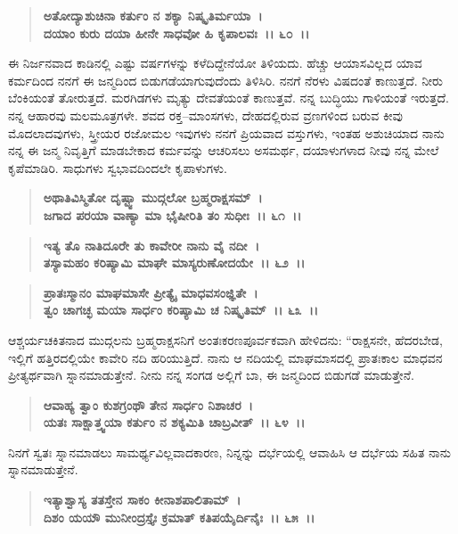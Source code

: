 \begin{verse}
\textbf{ಅತೋದ್ಯಾಶುಚಿನಾ ಕರ್ತುಂ ನ ಶಕ್ಯಾ ನಿಷ್ಕೃತಿರ್ಮಯಾ~।}\\\textbf{ದಯಾಂ ಕುರು ದಯಾ ಹೀನೇ ಸಾಧವೋ ಹಿ ಕೃಪಾಲವಃ~।। ೬೦~।।}
\end{verse}

ಈ ನಿರ್ಜನವಾದ ಕಾಡಿನಲ್ಲಿ ಎಷ್ಟು ವರ್ಷಗಳನ್ನು ಕಳೆದಿದ್ದೇನೆಯೋ ತಿಳಿಯದು. ಹೆಚ್ಚು ಆಯಾಸವಿಲ್ಲದ ಯಾವ ಕರ್ಮದಿಂದ ನನಗೆ ಈ ಜನ್ಮದಿಂದ ಬಿಡುಗಡೆಯಾಗುವುದೆಂದು ತಿಳಿಸಿರಿ. ನನಗೆ ನೆರಳು ವಿಷದಂತೆ ಕಾಣುತ್ತದೆ. ನೀರು ಬೆಂಕಿಯಂತೆ ತೋರುತ್ತದೆ. ಮರಗಿಡಗಳು ಮೃತ್ಯು ದೇವತೆಯಂತೆ ಕಾಣುತ್ತವೆ. ನನ್ನ ಬುದ್ಧಿಯು ಗಾಳಿಯಂತೆ ಇರುತ್ತದೆ. ನನ್ನ ಆಹಾರವು ಮಲಮೂತ್ರಗಳೇ. ಶವದ ರಕ್ತ–ಮಾಂಸಗಳು, ದೇಹದಲ್ಲಿರುವ ವ್ರಣಗಳಿಂದ ಬರುವ ಕೀವು ಮೊದಲಾದವುಗಳು, ಸ್ತ್ರೀಯರ ರಜೋಮಲ ಇವುಗಳು ನನಗೆ ಪ್ರಿಯವಾದ ವಸ್ತುಗಳು, ಇಂತಹ ಅಶುಚಿಯಾದ ನಾನು ನನ್ನ ಈ ಜನ್ಮ ನಿವೃತ್ತಿಗೆ ಮಾಡಬೇಕಾದ ಕರ್ಮವನ್ನು ಆಚರಿಸಲು ಅಸಮರ್ಥ, ದಯಾಳುಗಳಾದ ನೀವು ನನ್ನ ಮೇಲೆ ಕೃಪೆಮಾಡಿರಿ. ಸಾಧುಗಳು ಸ್ವಭಾವದಿಂದಲೇ ಕೃಪಾಳುಗಳು.

\begin{verse}
\textbf{ಅಥಾತಿವಿಸ್ಮಿತೋ ದೃಷ್ಟ್ವಾ ಮುದ್ಗಲೋ ಬ್ರಹ್ಮರಾಕ್ಷಸಮ್~।}\\\textbf{ಜಗಾದ ಪರಯಾ ವಾಣ್ಯಾ ಮಾ ಭೈಷೀರಿತಿ ತಂ ಸುಧೀಃ~।। ೬೧~।।} 
\end{verse}

\begin{verse}
\textbf{ಇತ್ಯ ತೊ ನಾತಿದೂರೇ ತು ಕಾವೇರೀ ನಾನು ವೈ ನದೀ~।}\\\textbf{ತಸ್ಯಾಮಹಂ ಕರಿಷ್ಯಾಮಿ ಮಾಘೇ ಮಾಸ್ಯರುಣೋದಯೇ~।। ೬೨~।। }
\end{verse}

\begin{verse}
\textbf{ಪ್ರಾತಃಸ್ಮಾನಂ ಮಾಘಮಾಸೇ ಪ್ರೀತ್ಯೈ ಮಾಧವಸಂಜ್ಞಿತೇ~।}\\\textbf{ತ್ವಂ ಚಾಗಚ್ಛ ಮಯಾ ಸಾರ್ಧಂ ಕರಿಷ್ಯಾಮಿ ಚ ನಿಷ್ಕೃತಿಮ್~।। ೬೩~।।}
\end{verse}

ಆಶ್ಚರ್ಯಚಕಿತನಾದ ಮುದ್ಗಲನು ಬ್ರಹ್ಮರಾಕ್ಷಸನಿಗೆ ಅಂತಃಕರಣಪೂರ್ವಕವಾಗಿ ಹೇಳಿದನು: “ರಾಕ್ಷಸನೇ, ಹೆದರಬೇಡ, ಇಲ್ಲಿಗೆ ಹತ್ತಿರದಲ್ಲಿಯೇ ಕಾವೇರಿ ನದಿ ಹರಿಯುತ್ತಿದೆ. ನಾನು ಆ ನದಿಯಲ್ಲಿ ಮಾಘಮಾಸದಲ್ಲಿ ಪ್ರಾತಃಕಾಲ ಮಾಧವನ ಪ್ರೀತ್ಯರ್ಥವಾಗಿ ಸ್ನಾನಮಾಡುತ್ತೇನೆ. ನೀನು ನನ್ನ ಸಂಗಡ ಅಲ್ಲಿಗೆ ಬಾ, ಈ ಜನ್ಮದಿಂದ ಬಿಡುಗಡೆ ಮಾಡುತ್ತೇನೆ.

\begin{verse}
\textbf{ಆವಾಹ್ಯ ತ್ವಾಂ ಕುಶಗ್ರಂಥೌ ತೇನ ಸಾರ್ಧಂ ನಿಶಾಚರ~।}\\\textbf{ಯತಃ ಸಾಕ್ಷಾತ್ತ್ವಯಾ ಕರ್ತುಂ ನ ಶಕ್ಯಮಿತಿ ಚಾಬ್ರವೀತ್~।। ೬೪~।।}
\end{verse}

ನಿನಗೆ ಸ್ವತಃ ಸ್ನಾನಮಾಡಲು ಸಾಮರ್ಥ್ಯವಿಲ್ಲವಾದಕಾರಣ, ನಿನ್ನನ್ನು ದರ್ಭೆಯಲ್ಲಿ ಆವಾಹಿಸಿ ಆ ದರ್ಭೆಯ ಸಹಿತ ನಾನು ಸ್ನಾನಮಾಡುತ್ತೇನೆ.

\begin{verse}
\textbf{ಇತ್ಯಾಶ್ವಾಸ್ಯ ತತಸ್ತೇನ ಸಾಕಂ ಕೀನಾಶಪಾಲಿತಾಮ್~।}\\\textbf{ದಿಶಂ ಯಯೌ ಮುನೀಂದ್ರಸ್ತೈಃ ಕ್ರಮಾತ್ ಕತಿಪಯೈರ್ದಿನೈಃ~।। ೬೫~।। }
\end{verse}

